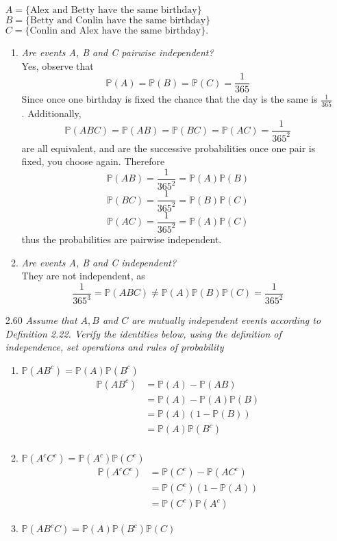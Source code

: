\documentclass[12pt, letterpaper]{article}
\newcommand{\Pro}{\mathbb{P}}
\begin{document}
\begin{enumerate}
\begin{center}
$A = \{\text{Alex and Betty have the same birthday}\}$
$B = \{\text{Betty and Conlin have the same birthday}\}$
$C = \{\text{Conlin and Alex have the same birthday}\}.$
	\begin{enumerate}
		\item \textit{Are events A, B and C pairwise independent?}\\
		Yes, observe that
		$$
		\Pro(A) = \Pro(B) = \Pro(C) = \frac{1}{365} 		
		$$
		Since once one birthday is fixed the chance that the day is the same is $\frac{1}{365}$.  Additionally,
		$$
		\Pro(ABC) = \Pro(AB) = \Pro(BC) = \Pro(AC) = \frac{1}{365^2}
		$$
		are all equivalent, and are the successive probabilities once one pair is fixed, you choose again.
		Therefore $$
			\Pro(AB) = \frac{1}{365^2} = \Pro(A)\Pro(B)		
		$$  
		$$
			\Pro(BC) = \frac{1}{365^2} = \Pro(B)\Pro(C)
		$$
		$$
			\Pro(AC) = \frac{1}{365^2} = \Pro(A)\Pro(C)
		$$
		thus the probabilities are pairwise independent.  
		\item \textit{Are events A, B and C independent?}\\
		They are not independent, as 
		$$
		\frac{1}{365^3} = \Pro(ABC) \neq \Pro(A)\Pro(B)\Pro(C) = \frac{1}{365^2}
		$$
	\end{enumerate}
\end{center}
	\item[2.60] \textit{Assume that $A, B$ and $C$ are mutually independent events
according to Definition 2.22. Verify the identities below, using the definition
of independence, set operations and rules of probability}
	\begin{enumerate}
		\item $\Pro(AB^c) = \Pro(A)\Pro(B^c)$\\
		\begin{align*}
			\Pro(AB^c) &= \Pro(A) - \Pro(AB)\\
				&= \Pro(A) - \Pro(A)\Pro(B)\\
				&= \Pro(A)(1-\Pro(B))\\
				&= \Pro(A)\Pro(B^c)\\
		\end{align*}
		\item $\Pro(A^c C^c) = \Pro(A^c)\Pro(C^c)$
		\begin{align*}
			\Pro(A^c C^c) &= \Pro(C^c) - \Pro(A C^c)\\
			&= \Pro(C^c)(1-\Pro(A))\\
			&= \Pro(C^c)\Pro(A^c)
		\end{align*}
		\item $\Pro(AB^cC) = \Pro(A)\Pro(B^c)\Pro(C)$\\

\end{enumerate}
\end{enumerate}
\end{document}
